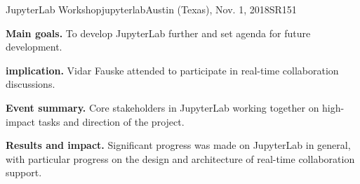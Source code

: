\begin{event}{JupyterLab Workshop}{jupyterlab}{Austin (Texas), Nov. 1, 2018}{SR}{15}{1}{}

\textbf{Main goals.} To develop JupyterLab further and set agenda for future development.

\textbf{\ODK implication.} Vidar Fauske attended to participate in real-time collaboration discussions.

\textbf{Event summary.} Core stakeholders in JupyterLab working together on high-impact tasks and direction of the project.

\textbf{Results and impact.} Significant progress was made on JupyterLab in general, with particular progress on the design and architecture of real-time collaboration support.

\end{event}
